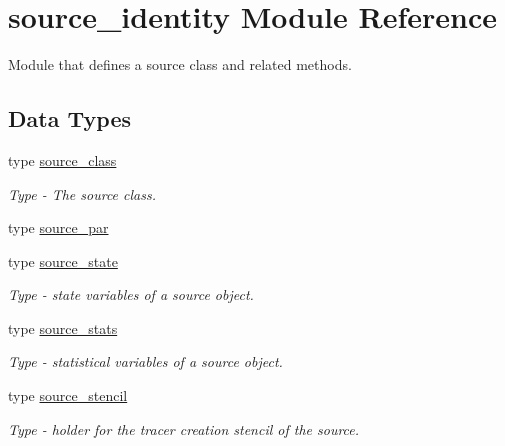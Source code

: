 \hypertarget{namespacesource__identity}{}\section{source\+\_\+identity Module Reference}
\label{namespacesource__identity}


Module that defines a source class and related methods.  


\subsection*{Data Types}
\begin{DoxyCompactItemize}
\item 
type \mbox{\hyperlink{structsource__identity_1_1source__class}{source\+\_\+class}}
\begin{DoxyCompactList}\small\item\em Type -\/ The source class. \end{DoxyCompactList}\item 
type \mbox{\hyperlink{structsource__identity_1_1source__par}{source\+\_\+par}}
\item 
type \mbox{\hyperlink{structsource__identity_1_1source__state}{source\+\_\+state}}
\begin{DoxyCompactList}\small\item\em Type -\/ state variables of a source object. \end{DoxyCompactList}\item 
type \mbox{\hyperlink{structsource__identity_1_1source__stats}{source\+\_\+stats}}
\begin{DoxyCompactList}\small\item\em Type -\/ statistical variables of a source object. \end{DoxyCompactList}\item 
type \mbox{\hyperlink{structsource__identity_1_1source__stencil}{source\+\_\+stencil}}
\begin{DoxyCompactList}\small\item\em Type -\/ holder for the tracer creation stencil of the source. \end{DoxyCompactList}\end{DoxyCompactItemize}
